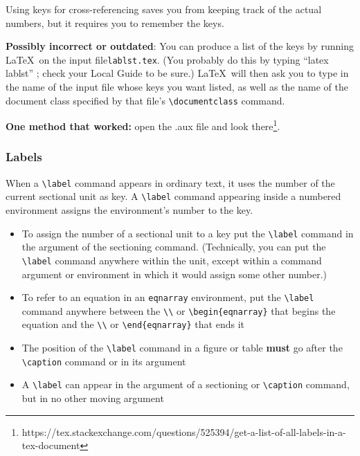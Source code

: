 \documentclass{article}
\newcommand{\justtext}[1]{\texttt{\textbackslash #1}}
\begin{document}
Using keys for cross-referencing saves you from keeping track of the actual numbers, but it requires
you to remember the keys. 

\textbf{Possibly incorrect or outdated}: You can produce a list of the keys by running \LaTeX\ on the
 input file{\tt lablst.tex}. (You probably do this by typing ``latex lablst'' ; check your Local
 Guide to be sure.) \LaTeX\ will then ask you to type in the name of the input file whose keys you
 want listed, as well as the name of the document class specified by that file's 
 \justtext{documentclass} command.
 
 \textbf{One method that worked:} open the .aux file and look 
 there\footnote{https://tex.stackexchange.com/questions/525394/get-a-list-of-all-labels-in-a-tex-document}.
 
\subsubsection{Labels}

When a \justtext{label} command appears in ordinary text, it uses the number of the current
sectional unit as key. A \justtext{label} command appearing inside a numbered environment assigns
the environment's number to the key.

\begin{itemize}
   
   \item To assign the number of a sectional unit to a key put the \justtext{label} command in the
    argument of the sectioning command. (Technically, you can put the \justtext{label} command
    anywhere within the unit, except within a command argument or environment in which it would
    assign some other number.)

   \item To refer to an equation in an {\tt eqnarray} environment, put the \justtext{label} command 
    anywhere between the \justtext{\textbackslash} or \justtext{begin\{eqnarray\}} that begins the 
    equation and the \justtext{\textbackslash} or \justtext{end\{eqnarray\}} that ends it

   \item The position of the \justtext{label} command in a figure or table \textbf{must} go after
    the \justtext{caption} command or in its argument
    
   \item A \justtext{label} can appear in the argument of a sectioning or \justtext{caption} 
    command, but in no other moving argument

\end{itemize}
\end{document}
